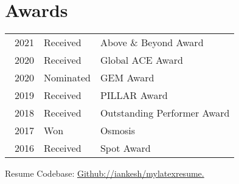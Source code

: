 \documentclass[a4paper]{deedy-resume-openfont}
\begin{document}
\section{Awards} 
\begin{tabular}{rll}\
2021	 & Received & Above \& Beyond Award \\
2020	 & Received & Global ACE Award \\
2020	 & Nominated& GEM Award\\
2019     & Received & PILLAR Award \\
2018     & Received & Outstanding Performer Award  \\
2017     & Won      & Osmosis \\
2016     & Received & Spot Award
\end{tabular}
\sectionsep

\center{\rule{6.5in}{0.2mm}}
\vspace{-2mm}
\center \small {Resume Codebase: {\href{https://github.com/iankesh/mylatexresume}{Github://iankesh/mylatexresume.}}}
\end{document}
